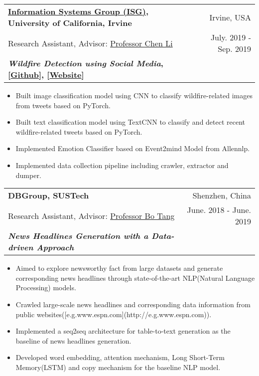 \documentclass[letterpaper,11pt]{article}
\makeatletter
\newcommand{\resumeSubheading}[6]{
  \vspace{-1pt}\item
    \begin{tabular*}{0.97\textwidth}[t]{l@{\extracolsep{\fill}}r}
      \textbf{#1} & #2 \\
      #3 & #4 \\
      \textbf{#5} & \textbf{#6} \\
    \end{tabular*}\vspace{-5pt}
}
\makeatother
\begin{document}
    \resumeSubheading

      {\href{https://isg.ics.uci.edu/}{Information Systems Group (ISG)}, University of California, Irvine}{Irvine, USA}

      {Research Assistant, Advisor: \href{https://chenli.ics.uci.edu/}{Professor Chen Li}}{July. 2019 - Sep. 2019}

      {\textit{Wildfire Detection using Social Media}, [\href{https://github.com/Yicong-Huang/Wildfires}{Github}], [\href{http://wildfires.ics.uci.edu:2333/}{Website}]}{}
      

        \begin{itemize}

          \item Built image classification model using CNN to classify wildfire-related images from tweets based on PyTorch.

          \item Built text classification model using TextCNN to classify and detect recent wildfire-related tweets based on PyTorch.

          \item Implemented Emotion Classifier based on Event2mind Model from Allennlp.

          \item Implemented data collection pipeline including crawler, extractor and dumper.

        \end{itemize}


    \resumeSubheading

      {DBGroup, SUSTech}{Shenzhen, China}

      {Research Assistant, Advisor: \href{https://acm.sustech.edu.cn/btang/}{Professor Bo Tang}}{June. 2018 - June. 2019}

      {\textit{News Headlines Generation with a Data-driven Approach}}{}

      
        \begin{itemize}

          \item Aimed to explore newsworthy fact from large datasets and generate corresponding news headlines through state-of-the-art NLP(Natural Language Processing) models. 

          \item Crawled large-scale news headlines and corresponding data information from public websites([e.g.www.espn.com](http://e.g.www.espn.com)).

          \item Implemented a seq2seq architecture for table-to-text generation as the baseline of news headlines generation.

          \item Developed word embedding, attention mechanism, Long Short-Term Memory(LSTM) and copy mechanism for the baseline NLP model.

        \end{itemize}
\end{document}
